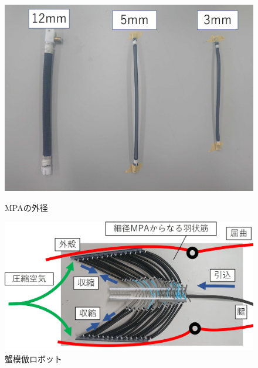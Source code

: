\documentclass{jarticle}
\begin{document}
\begin{figure}[H]
  \begin{minipage}[b]{0.47\columnwidth}
    \centering
    \includegraphics[scale=0.13]{image/mpa.JPG}
    \vspace{-4mm}
    \caption{MPAの外径}
    \label{fig:MPA}
  \end{minipage}
  \hspace{0.04\columnwidth}
  \begin{minipage}[b]{0.47\columnwidth}
    \centering
    \includegraphics[scale=0.19]{image/mosiki.JPG}
    \vspace{-6mm}
    \caption{蟹模倣ロボット\cite{crabrobot2}}
    \label{fig:crabrobot}
  \end{minipage}
\end{figure}
\vspace*{-5mm}
\end{document}
